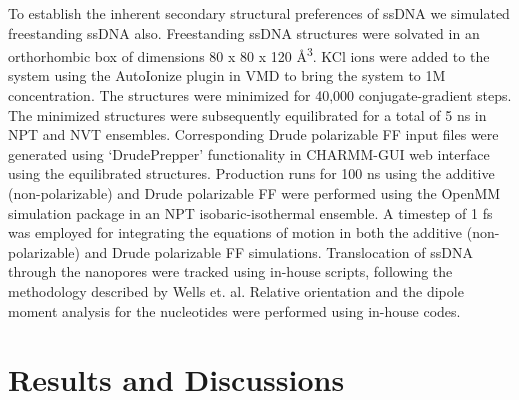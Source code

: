 To establish the inherent secondary structural preferences of ssDNA we simulated freestanding ssDNA also. Freestanding ssDNA structures were solvated in an orthorhombic box of dimensions 80 x 80 x 120 Å\textsuperscript{3}. KCl ions were added to the system using the AutoIonize plugin in VMD to bring the system to 1M concentration. The structures were minimized for 40,000 conjugate-gradient steps. The minimized structures were subsequently equilibrated for a total of 5 ns in NPT and NVT ensembles. Corresponding Drude polarizable FF input files were generated using ‘DrudePrepper’ functionality in CHARMM-GUI web interface\supercite{kognole_charmmgui_2022} using the equilibrated structures. Production runs for 100 ns using the additive (non-polarizable) and Drude polarizable FF were performed using the OpenMM simulation package\supercite{eastman_openmm_2017} in an NPT isobaric-isothermal ensemble. A timestep of 1 fs was employed for integrating the equations of motion in both the additive (non-polarizable) and Drude polarizable FF simulations. Translocation of ssDNA through the nanopores were tracked using in-house scripts, following the methodology described by Wells et. al.\supercite{wells_assessing_2012}  Relative orientation and the dipole moment analysis for the nucleotides were performed using in-house codes.

\section[Results and Discussions]{Results and Discussions}
